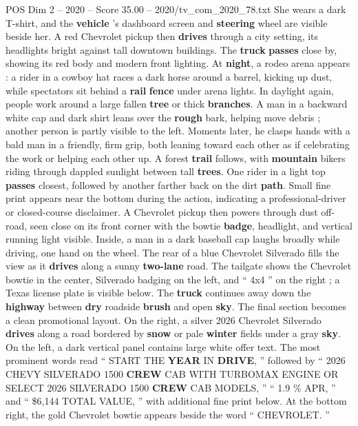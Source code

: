 \begin{textsample}{POS Dim 2 – 2020 – Score 35.00 – 2020/tv\_com\_2020\_78.txt}
She wears a dark T-shirt, and the \textbf{vehicle} ’s dashboard screen and \textbf{steering} wheel are visible beside her.
A red Chevrolet pickup then \textbf{drives} through a city setting, its headlights bright against tall downtown buildings.
The \textbf{truck} \textbf{passes} close by, showing its red body and modern front lighting.
At \textbf{night}, a rodeo arena appears : a rider in a cowboy hat races a dark horse around a barrel, kicking up dust, while spectators sit behind a \textbf{rail} \textbf{fence} under arena lights.
In daylight again, people work around a large fallen \textbf{tree} or thick \textbf{branches}.
A man in a backward white cap and dark shirt leans over the \textbf{rough} bark, helping move debris ; another person is partly visible to the left.
Moments later, he clasps hands with a bald man in a friendly, firm grip, both leaning toward each other as if celebrating the work or helping each other up.
A forest \textbf{trail} follows, with \textbf{mountain} bikers riding through dappled sunlight between tall \textbf{trees}.
One rider in a light top \textbf{passes} closest, followed by another farther back on the dirt \textbf{path}.
Small fine print appears near the bottom during the action, indicating a professional-driver or closed-course disclaimer.
A Chevrolet pickup then powers through dust off-road, seen close on its front corner with the bowtie \textbf{badge}, headlight, and vertical running light visible.
Inside, a man in a dark baseball cap laughs broadly while driving, one hand on the wheel.
The rear of a blue Chevrolet Silverado fills the view as it \textbf{drives} along a sunny \textbf{two-lane} road.
The tailgate shows the Chevrolet bowtie in the center, Silverado badging on the left, and “ 4x4 ” on the right ; a Texas license plate is visible below.
The \textbf{truck} continues away down the \textbf{highway} between \textbf{dry} roadside \textbf{brush} and open \textbf{sky}.
The final section becomes a clean promotional layout.
On the right, a silver 2026 Chevrolet Silverado \textbf{drives} along a road bordered by \textbf{snow} or pale \textbf{winter} fields under a gray \textbf{sky}.
On the left, a dark vertical panel contains large white offer text.
The most prominent words read “ START THE \textbf{YEAR} IN \textbf{DRIVE}, ” followed by “ 2026 CHEVY SILVERADO 1500 \textbf{CREW} CAB WITH TURBOMAX ENGINE OR SELECT 2026 SILVERADO 1500 \textbf{CREW} CAB MODELS, ” “ 1.9 \% APR, ” and “ \$6,144 TOTAL VALUE, ” with additional fine print below.
At the bottom right, the gold Chevrolet bowtie appears beside the word “ CHEVROLET. ”

\end{textsample}
